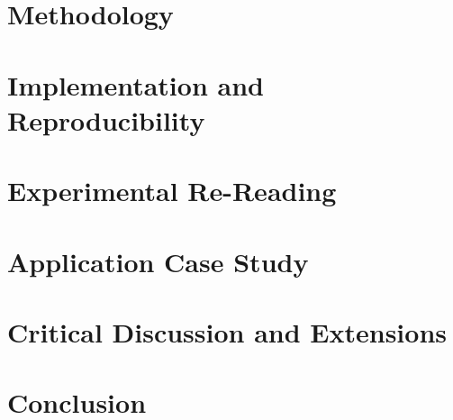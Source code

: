 \documentclass[10pt, journal, compsoc]{IEEEtran}
\begin{document}
\section{Methodology}


\section{Implementation and Reproducibility}


\section{Experimental Re-Reading}


\section{Application Case Study}


\section{Critical Discussion and Extensions}


\section{Conclusion}




\end{document}
